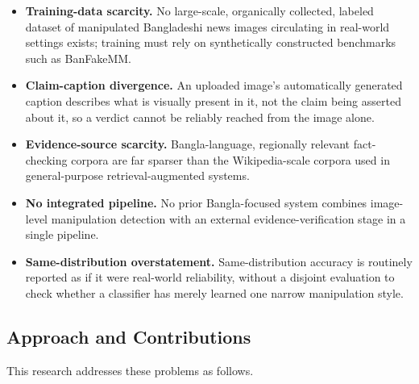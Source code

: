 \documentclass[conference,a4paper]{IEEEtran}
\begin{document}
\begin{itemize}
\item \textbf{Training-data scarcity.} No large-scale, organically collected,
labeled dataset of manipulated Bangladeshi news images circulating in
real-world settings exists; training must rely on synthetically constructed
benchmarks such as BanFakeMM.

\item \textbf{Claim-caption divergence.} An uploaded image's automatically
generated caption describes what is visually present in it, not the claim
being asserted about it, so a verdict cannot be reliably reached from the
image alone.

\item \textbf{Evidence-source scarcity.} Bangla-language, regionally relevant
fact-checking corpora are far sparser than the Wikipedia-scale corpora used in
general-purpose retrieval-augmented systems.

\item \textbf{No integrated pipeline.} No prior Bangla-focused system combines
image-level manipulation detection with an external evidence-verification
stage in a single pipeline.

\item \textbf{Same-distribution overstatement.} Same-distribution accuracy is
routinely reported as if it were real-world reliability, without a disjoint
evaluation to check whether a classifier has merely learned one narrow
manipulation style.
\end{itemize}

\subsection{Approach and Contributions}

This research addresses these problems as follows.
\end{document}
